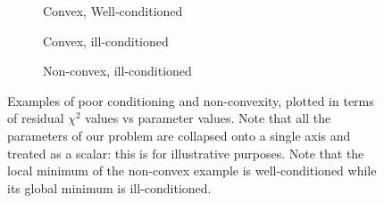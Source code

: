\begin{figure}[h!]
\centering
\begin{subfigure}{.32\textwidth}
\caption{\label{fig.goodconditioning} Convex, Well-conditioned}
\end{subfigure}
\hfill
\begin{subfigure}{.32\textwidth}
\caption{\label{fig.badconditioning} Convex, ill-conditioned}
\end{subfigure}
\hfill
\begin{subfigure}{.32\textwidth}
\caption{\label{fig.notconvex} Non-convex, ill-conditioned}
\end{subfigure}
\caption{\label{fig.examples} Examples of poor conditioning and non-convexity, plotted in terms of residual $\chi^2$ values vs parameter values.  Note that all the parameters of our problem are collapsed onto a single axis and treated as a scalar: this is for illustrative purposes. Note that the local minimum of the non-convex example is well-conditioned while its global minimum is ill-conditioned.}
\end{figure}


